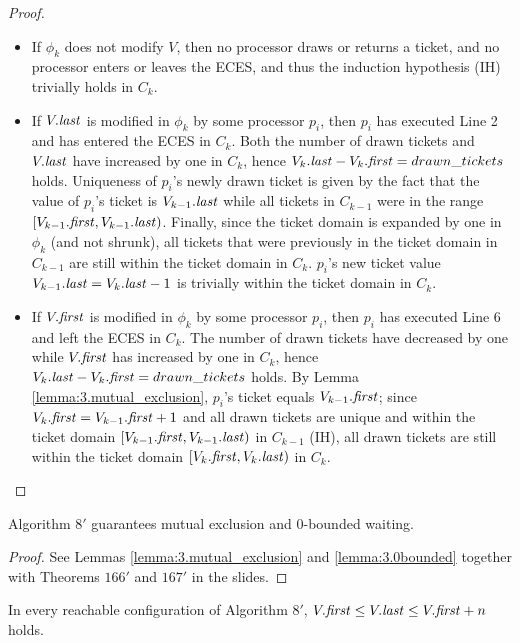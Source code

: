 \begin{proof}
\begin{itemize}
\item If $\phi_k$ does not modify $V$, then no processor draws or returns a ticket,
      and no processor enters or leaves the ECES, and thus the induction hypothesis (IH)
      trivially holds in $C_k$.
\item If $V.\mathit{last}$ is modified in $\phi_k$ by some processor $p_i$, then $p_i$ has executed
      Line 2 and has entered the ECES in $C_k$. Both the number of drawn tickets
      and $V.\mathit{last}$ have increased by one in $C_k$, hence $V_k.\mathit{last} - V_k.\mathit{first} = drawn\_tickets$
      holds. Uniqueness of $p_i$'s newly drawn ticket is given by the fact that
      the value of $p_i$'s ticket is $V_{k-1}.\mathit{last}$ while all tickets in $C_{k-1}$
      were in the range $[V_{k-1}.\mathit{first}, V_{k-1}.\mathit{last})$. Finally, since the ticket domain
      is expanded by one in $\phi_k$ (and not shrunk), all tickets that were previously
      in the ticket domain in $C_{k-1}$ are still within the ticket domain in $C_k$.
      $p_i$'s new ticket value $V_{k-1}.\mathit{last} = V_k.\mathit{last} - 1$ is trivially within
      the ticket domain in $C_k$.
\item If $V.\mathit{first}$ is modified in $\phi_k$ by some processor $p_i$, then $p_i$ has executed
      Line 6 and left the ECES in $C_k$. The number of drawn tickets
      have decreased by one while $V.\mathit{first}$ has increased by one in $C_k$, hence
      $V_k.\mathit{last} - V_k.\mathit{first} = drawn\_tickets$ holds.
      By Lemma \ref{lemma:3.mutual_exclusion}, $p_i$'s ticket equals $V_{k-1}.\mathit{first}$;
      since $V_k.\mathit{first} = V_{k-1}.\mathit{first} + 1$ and all drawn tickets are unique
      and within the ticket domain $[V_{k-1}.\mathit{first}, V_{k-1}.\mathit{last})$ in $C_{k-1}$ (IH),
      all drawn tickets are still within the ticket domain $[V_k.\mathit{first}, V_k.\mathit{last})$
      in $C_k$.
\end{itemize}

\end{proof}

\begin{theorem}
Algorithm $8'$ guarantees mutual exclusion and 0-bounded waiting.
\end{theorem}

\begin{proof}
See Lemmas \ref{lemma:3.mutual_exclusion} and \ref{lemma:3.0bounded} together with
Theorems $166'$ and $167'$ in the slides.
\end{proof}


\begin{lemma} \label{lemma:3.Vbounds}
In every reachable configuration of Algorithm $8'$,
$V.\mathit{first} \leq V.\mathit{last} \leq V.\mathit{first}+n$ holds.
\end{lemma}

